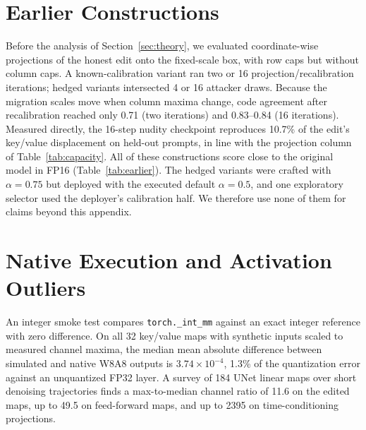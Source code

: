 \section{Earlier Constructions}
\label{app:earlier}
Before the analysis of Section~\ref{sec:theory}, we evaluated coordinate-wise
projections of the honest edit onto the fixed-scale box, with row caps but without
column caps. A known-calibration variant ran two or 16 projection/recalibration
iterations; hedged variants intersected 4 or 16 attacker draws. Because the
migration scales move when column maxima change, code agreement after recalibration
reached only 0.71 (two iterations) and 0.83--0.84 (16 iterations). Measured directly, the 16-step nudity
checkpoint reproduces 10.7\% of the edit's key/value displacement on held-out
prompts, in line with the projection column of Table~\ref{tab:capacity}. All of these
constructions score close to the original model in FP16 (Table~\ref{tab:earlier}). The hedged variants were crafted with
$\alpha=0.75$ but deployed with the executed default $\alpha=0.5$, and one
exploratory selector used the deployer's calibration half. We therefore use none of
them for claims beyond this appendix.

\begin{table}[h]
\centering
\caption{Earlier constructions (192 images per cell; native-minus-FP16 gap with
paired crossed 95\% interval). Honest FP16 references are 0.504 (style) and 0.176
(nudity).}
\label{tab:earlier}
\end{table}

\section{Native Execution and Activation Outliers}
\label{app:native}
An integer smoke test compares \texttt{torch.\_int\_mm} against an exact integer
reference with zero difference. On all 32 key/value maps with synthetic inputs scaled
to measured channel maxima, the median mean absolute difference between simulated and
native W8A8 outputs is $3.74\times10^{-4}$, 1.3\% of the quantization error against an
unquantized FP32 layer. A survey of 184 UNet linear maps over short denoising
trajectories finds a max-to-median channel ratio of 11.6 on the edited maps, up to
49.5 on feed-forward maps, and up to 2395 on time-conditioning projections.

